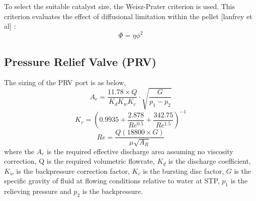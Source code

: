 To select the suitable catalyst size, the Weisz-Prater criterion is used. This criterion evaluates the effect of diffusional limitation within the pellet [lanfrey et al] :
\begin{equation}
    \Phi = \eta \phi^2
\end{equation}




\subsection{Pressure Relief Valve (PRV)}
\label{app:PRV}
The sizing of the PRV port is as below,
\begin{equation}
    A_r = \frac{11.78 \times Q}{K_d K_w K_c} \cdot \sqrt{\frac{G}{p_1-p_2}}
\end{equation}
\begin{equation}
    K_v = (0.9935 + \frac{2.878}{Re^{0.5}} + \frac{342.75}{Re^{1.5}})^{-1}
\end{equation}
\begin{equation}
    Re = \frac{Q(18800 \times G)}{\mu \sqrt{A_R}}
\end{equation}
where the $A_r$ is the required effective discharge area assuming no viscosity correction, Q is the required volumetric flowrate, $K_d$ is the discharge coefficient, $K_w$ is the backpressure correction factor, $K_c$ is the bursting disc factor, $G$ is the specific gravity of fluid at flowing conditions relative to water at STP, $p_1$ is the relieving pressure and $p_2$ is the backpressure. 



